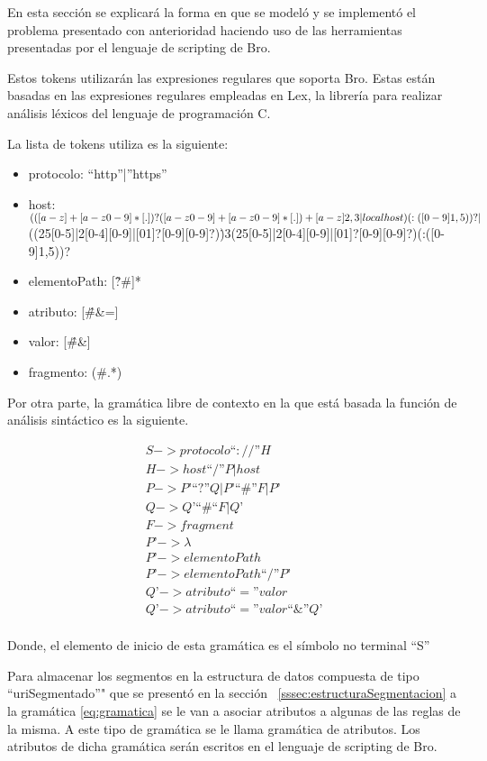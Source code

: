 En esta sección se explicará la forma en que se modeló y se implementó el problema presentado con anterioridad haciendo uso de las herramientas presentadas por el lenguaje de scripting de Bro.

Estos tokens utilizarán las expresiones regulares que soporta Bro. Estas están basadas en las expresiones regulares empleadas en Lex, la librería para realizar análisis léxicos del lenguaje de programación C.

La lista de tokens utiliza es la siguiente:

\begin{itemize}
\item protocolo: “http”|”https”
\item host: $(([a-z]+[a-z0-9\-]*[.])?([a-z0-9]+[a-z0-9\-]*[.])+[a-z]{2,3}|localhost)(:([0-9]{1,5}))?|$\\ ((25[0-5]|2[0-4][0-9]|[01]?[0-9][0-9]?)\.){3}(25[0-5]|2[0-4][0-9]|[01]?[0-9][0-9]?)(:([0-9]{1,5}))?
\item elementoPath: [\^?\#]*
\item atributo: [\^\#\&=]
\item valor: [\^\#\&]
\item fragmento: (\#.*)
\end{itemize}

Por otra parte, la gramática libre de contexto en la que está basada la función de análisis sintáctico es la siguiente.

\begin{equation}\label{eq:gramatica}
\begin{aligned}
S -> protocolo “ :// ” H  \\
H -> host “/” P | host \\
P -> P’ “?” Q | P’ “\#” F | P’ \\
Q -> Q’ “\#“ F | Q’ \\
F -> fragment \\
P’ -> \lambda \\
P’ ->  elementoPath \\
P’ -> elementoPath “/” P’ \\
Q’ -> atributo “=” valor \\
Q’ -> atributo “=” valor “\&” Q’ \\
\end{aligned}
\end{equation}

Donde, el elemento de inicio de esta gramática es el símbolo no terminal “S”

Para almacenar los segmentos en la estructura de datos compuesta de tipo “uriSegmentado”" que se presentó en la sección ~\ref{sssec:estructuraSegmentacion} a la gramática \ref{eq:gramatica} se le van a asociar atributos a algunas de las reglas de la misma. A este tipo de gramática se le llama gramática de atributos. Los atributos de dicha gramática serán escritos en el lenguaje de scripting de Bro.

